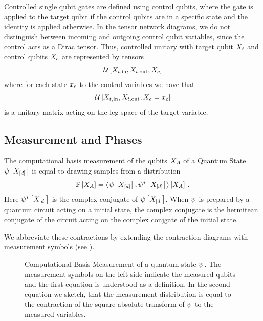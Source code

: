 Controlled single qubit gates are defined using control qubits, where the gate is applied to the target qubit if the control qubits are in a specific state and the identity is applied otherwise.
In the tensor network diagrams, we do not distinguish between incoming and outgoing control qubit variables, since the control acts as a Dirac tensor.
Thus, controlled unitary with target qubit $X_{t}$ and control qubits $X_{c}$ are represented by tensors
\begin{align*}
    \mathcal{U}\left[X_{t,\mathrm{in}},X_{t,\mathrm{out}},X_{c}\right]
\end{align*}
where for each state $x_{c}$ to the control variables we have that
\begin{align*}
    \mathcal{U}\left[X_{t,\mathrm{in}},X_{t,\mathrm{out}},X_{c}=x_{c}\right]
\end{align*}
is a unitary matrix acting on the leg space of the target variable.

\subsection{Measurement and Phases}

The computational basis measurement of the qubits $X_{A}$ of a Quantum State $\psi\left[X_{[d]}\right]$ is equal to drawing samples from a distribution
\begin{align*}
    \mathbb{P}\left[X_{A}\right] = \left\langle 
        \psi\left[X_{[d]}\right], \psi^{*}\left[X_{[d]}\right]
    \right\rangle \left[ X_{A} \right] \, .
\end{align*}
Here $\psi^{*}\left[X_{[d]}\right]$ is the complex conjugate of $\psi\left[X_{[d]}\right]$.
When $\psi$ is prepared by a quantum circuit acting on a initial state, the complex conjugate is the hermitean conjugate of the circuit acting on the complex conjgate of the initial state.

We abbreviate these contractions by extending the contraction diagrams with measurement symbols (see ).
\begin{figure}
    \begin{center}
        
    \end{center}
    \caption{Computational Basis Measurement of a quantum state $\psi$.
    The measurement symbols on the left side indicate the measured qubits and the first equation is understood as a definition.
    In the second equation we sketch, that the measurement distribution is equal to the contraction of the square absolute transform of $\psi$ to the measured variables.
    }\label{fig:measurementSketch}
\end{figure}

